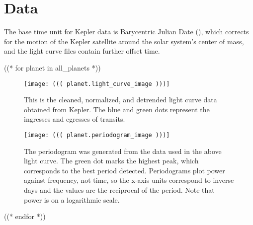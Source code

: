 \section{Data}

The base time unit for Kepler data is Barycentric Julian Date (\si{\bjd}), which corrects for the motion of the Kepler satellite around
the solar system's center of mass, and the light curve files contain further offset time. \autocite{keplerManual}



((* for planet in all_planets *))

\begin{figure}[H]
    \centering
    \texttt{[image: ((( planet.light\_curve\_image )))]}
    \caption{This is the cleaned, normalized, and detrended light curve data
    obtained from Kepler. The blue and green dots represent the ingresses and
    egresses of transits.}
\end{figure}

\begin{figure}[H]
    \centering
    \texttt{[image: ((( planet.periodogram\_image )))]}
    \caption{The periodogram was generated from the data used in the above light curve. The green dot marks the highest peak, which corresponds to
    the best period detected. Periodograms plot power against frequency, not time, so the x-axis units correspond to inverse days and the values
    are the reciprocal of the period. Note that power is on a logarithmic scale.}
\end{figure}

((* endfor *))
